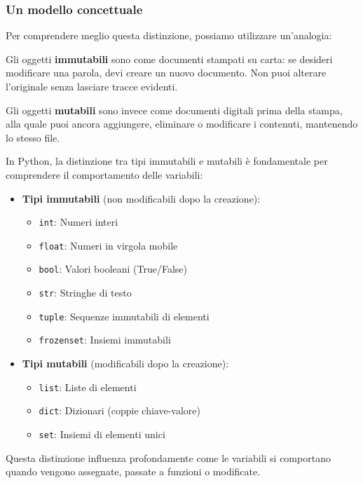     \subsubsection*{Un modello concettuale}
    Per comprendere meglio questa distinzione, possiamo utilizzare un'analogia:

    Gli oggetti \textbf{immutabili} sono come documenti stampati su carta: se desideri modificare una parola, devi creare un nuovo documento. Non puoi alterare l'originale senza lasciare tracce evidenti.

    Gli oggetti \textbf{mutabili} sono invece come documenti digitali prima della stampa, alla quale puoi ancora aggiungere, eliminare o modificare i contenuti, mantenendo lo stesso file.
\vspace{0,5cm}
    

\begin{tcolorbox}[colback=blue!5!white,colframe=blue!75!black,title=Differenza tra tipi immutabili e mutabili]\label{TabellaMutabilitàImmutabilità}
In Python, la distinzione tra tipi immutabili e mutabili è fondamentale per comprendere il comportamento delle variabili:

\begin{itemize}[leftmargin=*,itemsep=0.5em]
    \item \textbf{Tipi immutabili} (non modificabili dopo la creazione):
    \begin{itemize}
        \item \texttt{int}: Numeri interi
        \item \texttt{float}: Numeri in virgola mobile
        \item \texttt{bool}: Valori booleani (True/False)
        \item \texttt{str}: Stringhe di testo
        \item \texttt{tuple}: Sequenze immutabili di elementi
        \item \texttt{frozenset}: Insiemi immutabili
    \end{itemize}
    
    \item \textbf{Tipi mutabili} (modificabili dopo la creazione):
    \begin{itemize}
        \item \texttt{list}: Liste di elementi
        \item \texttt{dict}: Dizionari (coppie chiave-valore)
        \item \texttt{set}: Insiemi di elementi unici
    \end{itemize}
\end{itemize}

Questa distinzione influenza profondamente come le variabili si comportano quando vengono assegnate, passate a funzioni o modificate.
\end{tcolorbox}

